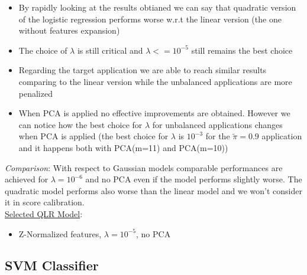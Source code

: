 \documentclass[10pt, a4paper, twocolumn]{article} %
\begin{document}
\begin{itemize}
	\item By rapidly looking at the results obtianed we can say that quadratic version of the logistic regression
	performs worse w.r.t the linear version (the one without features expansion)
	\item The choice of $\lambda$ is still critical and $\lambda <= 10^{-5}$ still remains the best choice
	\item Regarding the target application
	we are able to reach similar results comparing to the linear version while the unbalanced applications
	are more penalized
	\item When PCA is applied no effective improvements are obtained. However we can notice how the best
	choice for $\lambda$ for unbalanced applications changes when PCA is applied (the best choice
	for $\lambda$ is $10^{-3}$ for the $\tilde{\pi} = 0.9$ application and it happens both with
	PCA(m=11) and PCA(m=10))
	
\end{itemize}


\textit{Comparison}: With respect to Gaussian models comparable performances are achieved for $\lambda=10^{-6}$ and
no PCA even if the model performs slightly worse. The quadratic model performs also worse than the linear model and
we won't consider it in score calibration.
\\ 
\underline{Selected QLR Model}: 
\begin{itemize}
	\item Z-Normalized features, $\lambda=10^{-5}$, no PCA
\end{itemize}
\subsection{SVM Classifier}
\end{document}
